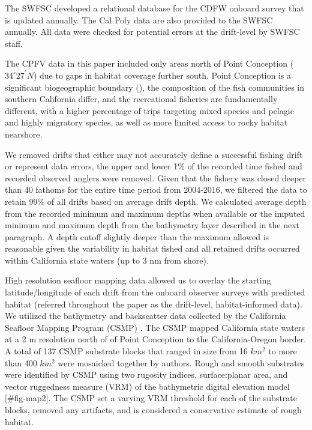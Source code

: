 \documentclass[
  12pt,
  authoryear,
  preprint,
  3p]{elsarticle}
\begin{document}
The SWFSC developed a relational database for the CDFW onboard survey
\citeyearpar{Monk:2014:DRD} that is updated annually. The Cal Poly data
are also provided to the SWFSC annually. All data were checked for
potential errors at the drift-level by SWFSC staff.

The CPFV data in this paper included only areas north of Point
Conception (\(34^\circ 27^\prime N\)) due to gaps in habitat coverage
further south. Point Conception is a significant biogeographic boundary
(\citet{Valentine:1966:NAM}), the composition of the fish communities in
southern California differ, and the recreational fisheries are
fundamentally different, with a higher percentage of trips targeting
mixed species and pelagic and highly migratory species, as well as more
limited access to rocky habitat nearshore.

We removed drifts that either may not accurately define a successful
fishing drift or represent data errors, the upper and lower 1\% of the
recorded time fished and recorded observed anglers were removed. Given
that the fishery was closed deeper than 40 fathoms for the entire time
period from 2004-2016, we filtered the data to retain 99\% of all drifts
based on average drift depth. We calculated average depth from the
recorded minimum and maximum depths when available or the imputed
minimum and maximum depth from the bathymetry layer described in the
next paragraph. A depth cutoff slightly deeper than the maximum allowed
is reasonable given the variability in habitat fished and all retained
drifts occurred within California state waters (up to 3 nm from shore).

High resolution seafloor mapping data allowed us to overlay the starting
latitude/longitude of each drift from the onboard observer surveys with
predicted habitat (referred throughout the paper as the drift-level,
habitat-informed data). We utilized the bathymetry and backscatter data
collected by the California Seafloor Mapping Program (CSMP)
\citep{Golden:2013:CSW, CSUMB:2014:CSM}. The CSMP mapped California
state waters at a 2 m resolution north of of Point Conception to the
California-Oregon border. A total of 137 CSMP substrate blocks that
ranged in size from 16 \(km^2\) to more than 400 \(km^2\) were mosaicked
together by authors. Rough and smooth substrates were identified by CSMP
using two rugosity indices, surface:planar area, and vector ruggedness
measure (VRM) of the bathymetric digital elevation model
{[}\#fig-map2{]}. The CSMP set a varying VRM threshold for each of the
substrate blocks, removed any artifacts, and is considered a
conservative estimate of rough habitat.
\end{document}
